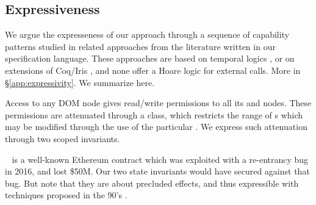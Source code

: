 \newcommand{\paragraphSDD}[1]{\vspace{.02cm}{\textit{#1}}}
 
\subsection{Expressiveness} 

We argue the expresseness of our approach  through a sequence of capability patterns studied in related approaches from the literature  
 \cite{OOPSLA22,dd,VerX,irisWasm23} written in our specification language.
These approaches %
 are based on temporal logics \cite{VerX,OOPSLA22}, or on extensions of Coq/Iris \cite{dd,irisWasm23}, and
none offer a Hoare logic    for external calls.
More in  \S \ref{app:expressivity}. 
We   summarize here.

 

\paragraphSDD{DOM} %
Access to any DOM node
gives read/write  permissions to  all its  and  nodes. 
These permissions are attenuated   through a  class, %
 which restricts the range of s which may be modified through the use of the particular . 
We  express such  attenuation   through two scoped invariants.

\paragraphSDD{DAO} %
 ~\cite{Dao}  is a well-known Ethereum contract   which was exploited with a re-entrancy bug in 2016, 
and lost \$50M. 
Our two state invariants  would have secured %
 against that bug. %
But note  that  they are about precluded effects, and 
thus expressible %
 with techniques proposed in the 90's \cite{MeyerDBC92}.
 
